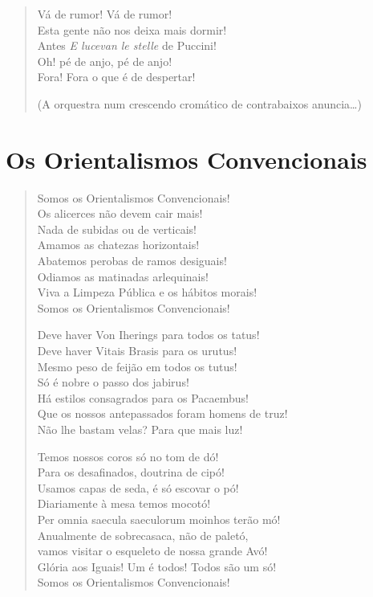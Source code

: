 \begin{verse}
Vá de rumor! Vá de rumor!\\
Esta gente não nos deixa mais dormir!\\
Antes \emph{E lucevan le stelle} de Puccini!\\
Oh! pé de anjo, pé de anjo!\\
Fora! Fora o que é de despertar!

\hfill{}(A orquestra num crescendo cromático de contrabaixos anuncia\ldots{})
\end{verse}

\section*{Os Orientalismos Convencionais}

\begin{verse}
Somos os Orientalismos Convencionais!\\
Os alicerces não devem cair mais!\\
Nada de subidas ou de verticais!\\
Amamos as chatezas horizontais!\\
Abatemos perobas de ramos desiguais!\\
Odiamos as matinadas arlequinais!\\
Viva a Limpeza Pública e os hábitos morais!\\
Somos os Orientalismos Convencionais!

Deve haver Von Iherings para todos os tatus!\\
Deve haver Vitais Brasis para os urutus!\\
Mesmo peso de feijão em todos os tutus!\\
Só é nobre o passo dos jabirus!\\
Há estilos consagrados para os Pacaembus!\\
Que os nossos antepassados foram homens de truz!\\
Não lhe bastam velas? Para que mais luz!

Temos nossos coros só no tom de dó!\\
Para os desafinados, doutrina de cipó!\\
Usamos capas de seda, é só escovar o pó!\\
Diariamente à mesa temos mocotó!\\
Per omnia saecula saeculorum moinhos terão mó!\\
Anualmente de sobrecasaca, não de paletó,\\
vamos visitar o esqueleto de nossa grande Avó!\\
Glória aos Iguais! Um é todos! Todos são um só!\\
Somos os Orientalismos Convencionais!
\end{verse}

